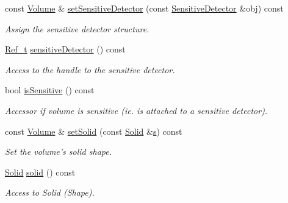 \begin{DoxyCompactItemize}
const \hyperlink{class_d_d4hep_1_1_geometry_1_1_volume}{Volume} \& \hyperlink{class_d_d4hep_1_1_geometry_1_1_volume_a0aab37c2e9c3d24ebbc6642f0951e217}{setSensitiveDetector} (const \hyperlink{class_d_d4hep_1_1_geometry_1_1_sensitive_detector}{SensitiveDetector} \&obj) const 
\begin{DoxyCompactList}\small\item\em Assign the sensitive detector structure. \item\end{DoxyCompactList}\item 
\hyperlink{group___d_d4_h_e_p___g_e_o_m_e_t_r_y_ga40af83be6718bb8828a3d83dc7f8c930}{Ref\_\-t} \hyperlink{class_d_d4hep_1_1_geometry_1_1_volume_a8dcf0ca9c159ed116f3f85fd67efa336}{sensitiveDetector} () const 
\begin{DoxyCompactList}\small\item\em Access to the handle to the sensitive detector. \item\end{DoxyCompactList}\item 
bool \hyperlink{class_d_d4hep_1_1_geometry_1_1_volume_a7b4a6460ec44a12b59fc1a00556c21cf}{isSensitive} () const 
\begin{DoxyCompactList}\small\item\em Accessor if volume is sensitive (ie. is attached to a sensitive detector). \item\end{DoxyCompactList}\item 
const \hyperlink{class_d_d4hep_1_1_geometry_1_1_volume}{Volume} \& \hyperlink{class_d_d4hep_1_1_geometry_1_1_volume_ab620d3dc2b453442d9b806e338b661f7}{setSolid} (const \hyperlink{class_d_d4hep_1_1_geometry_1_1_solid__type}{Solid} \&\hyperlink{_volumes_8cpp_a17ca6bfc8040d695d3cada22a4763d40}{s}) const 
\begin{DoxyCompactList}\small\item\em Set the volume's solid shape. \item\end{DoxyCompactList}\item 
\hyperlink{class_d_d4hep_1_1_geometry_1_1_solid__type}{Solid} \hyperlink{class_d_d4hep_1_1_geometry_1_1_volume_a35ba3ff621375ca5fb8e5c9474e4e179}{solid} () const 
\begin{DoxyCompactList}\small\item\em Access to Solid (Shape). \item\end{DoxyCompactList}\item 

\end{DoxyCompactItemize}
